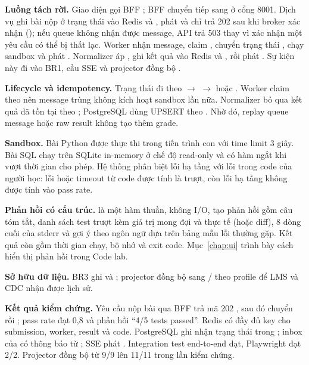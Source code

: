 \textbf{Luồng tách rời.} Giao diện gọi BFF ; BFF chuyển tiếp sang  ở cổng 8001. Dịch vụ ghi bài nộp ở trạng thái  vào Redis và , phát  và chỉ trả 202 sau khi broker xác nhận (); nếu queue không nhận được message, API trả 503 thay vì xác nhận một yêu cầu có thể bị thất lạc. Worker nhận message, claim , chuyển trạng thái , chạy sandbox và phát . Normalizer áp , ghi kết quả vào Redis và , rồi phát . Sự kiện này đi vào BR1, cầu SSE và projector đồng bộ .

\textbf{Lifecycle và idempotency.} Trạng thái đi theo  $\rightarrow$  $\rightarrow$  hoặc . Worker claim theo  nên message trùng không kích hoạt sandbox lần nữa. Normalizer bỏ qua kết quả đã tồn tại theo ; PostgreSQL dùng UPSERT theo . Nhờ đó, replay queue message hoặc raw result không tạo thêm grade.

\textbf{Sandbox.} Bài Python được thực thi trong tiến trình con với time limit 3 giây. Bài SQL chạy trên SQLite in-memory ở chế độ read-only và có hàm ngắt khi vượt thời gian cho phép. Hệ thống phân biệt lỗi hạ tầng với lỗi trong code của người học: lỗi hoặc timeout từ code được tính là trượt, còn lỗi hạ tầng không được tính vào pass rate.

\textbf{Phản hồi có cấu trúc.}  là một hàm thuần, không I/O, tạo phản hồi gồm câu tóm tắt, danh sách test trượt kèm giá trị mong đợi và thực tế (hoặc diff), 8 dòng cuối của stderr và gợi ý theo ngôn ngữ dựa trên bảng mẫu lỗi thường gặp. Kết quả còn gồm thời gian chạy, bộ nhớ và exit code. Mục~\ref{chap:ui} trình bày cách hiển thị phản hồi trong Code lab.

\textbf{Sở hữu dữ liệu.} BR3 ghi  và ; projector  đồng bộ sang / theo profile  để LMS và CDC nhận được lịch sử.

\textbf{Kết quả kiểm chứng.} Yêu cầu nộp bài qua BFF trả mã 202 , sau đó chuyển  rồi ; pass rate đạt 0,8 và phản hồi ``4/5 tests passed''. Redis có đầy đủ key cho submission, worker, result và code. PostgreSQL ghi nhận trạng thái  trong ; inbox của  có thông báo từ ; SSE phát . Integration test end-to-end đạt, Playwright đạt 2/2. Projector đồng bộ  từ 9/9 lên 11/11 trong lần kiểm chứng.

